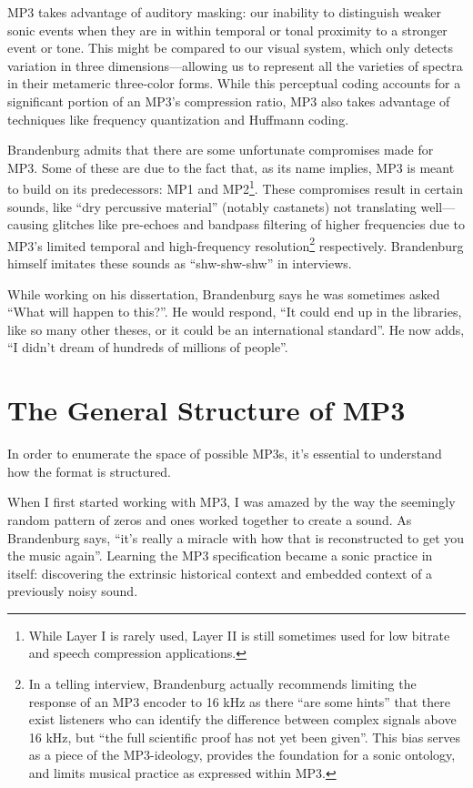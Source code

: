 \documentclass{thesis}
\begin{document}
MP3 takes advantage of auditory masking: our inability to distinguish weaker sonic events when they are in within temporal or tonal proximity to a stronger event or tone.\cite{Ruckert05} This might be compared to our visual system, which only detects variation in three dimensions---allowing us to represent all the varieties of spectra in their metameric three-color forms. While this perceptual coding accounts for a significant portion of an MP3's compression ratio, MP3 also takes advantage of techniques like frequency quantization and Huffmann coding.

Brandenburg admits that there are some unfortunate compromises made for MP3. Some of these are due to the fact that, as its name implies, MP3 is meant to build on its predecessors: MP1 and MP2\footnote{While Layer I is rarely used, Layer II is still sometimes used for low bitrate and speech compression applications.}. These compromises result in certain sounds, like ``dry percussive material'' (notably castanets) not translating well\cite{karlheinz_brandenburg_mp3_1999}---causing glitches like pre-echoes and bandpass filtering of higher frequencies due to MP3's limited temporal and high-frequency resolution\footnote{In a telling interview, Brandenburg actually recommends limiting the response of an MP3 encoder to 16 kHz as there ``are some hints'' that there exist listeners who can identify the difference between complex signals above 16 kHz, but ``the full scientific proof has not yet been given''.\cite[10]{karlheinz_brandenburg_mp3_1999} This bias serves as a piece of the MP3-ideology, provides the foundation for a sonic ontology, and limits musical practice as expressed within MP3.} respectively. Brandenburg himself imitates these sounds as ``shw-shw-shw'' in interviews.

While working on his dissertation, Brandenburg says he was sometimes asked ``What will happen to this?''. He would respond, ``It could end up in the libraries, like so many other theses, or it could be an international standard''. He now adds, ``I didn't dream of hundreds of millions of people''.
	
\section{The General Structure of MP3}

In order to enumerate the space of possible MP3s, it's essential to understand how the format is structured.

When I first started working with MP3, I was amazed by the way the seemingly random pattern of zeros and ones worked together to create a sound. As Brandenburg says, ``it's really a miracle with how that is reconstructed to get you the music again''\cite{tom_merritt_real_2010}. Learning the MP3 specification became a sonic practice in itself: discovering the extrinsic historical context and embedded context of a previously noisy sound.
\end{document}

